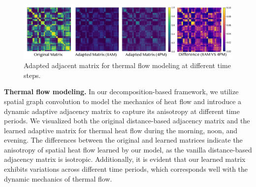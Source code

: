 \begin{figure}[!t]
    \centering
    \includegraphics[width=1.0\linewidth]{resources/flow.pdf}
    \vspace{-2em}
    \caption{Adapted adjacent matrix for thermal flow modeling at different time steps.}
    \label{fig:flow}
    \vspace{-1em}
\end{figure}


\textbf{Thermal flow modeling.} In our decomposition-based framework, we utilize spatial graph convolution to model the mechanics of heat flow and introduce a dynamic adaptive adjacency matrix to capture its anisotropy at different time periods. We visualized both the original distance-based adjacency matrix and the learned adaptive matrix for thermal heat flow during the morning, noon, and evening. The differences between the original and learned matrices indicate the anisotropy of spatial heat flow learned by our model, as the vanilla distance-based adjacency matrix is isotropic. Additionally, it is evident that our learned matrix exhibits variations across different time periods, which corresponds well with the dynamic mechanics of thermal flow.

